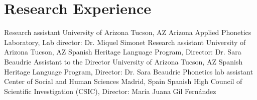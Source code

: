 
\section{Research Experience}

        {Research assistant}
        {University of Arizona}
        {Tucson, AZ}
        {}
        {Arizona Applied Phonetics Laboratory, Lab director: Dr. Miquel Simonet}
        {Research assistant}
        {University of Arizona}
        {Tucson, AZ}
        {}
        {Spanish Heritage Language Program, Director: Dr. Sara Beaudrie}
        {Assistant to the Director}
        {University of Arizona}
        {Tucson, AZ}
        {}
        {Spanish Heritage Language Program, Director: Dr. Sara Beaudrie}
        {Phonetics lab assistant}
        {Center of Social and Human Sciences}
        {Madrid, Spain}
        {}
        {Spanish High Council of Scientific Investigation (CSIC), Director: 
        Mar\'ia Juana Gil Fern\'andez}
